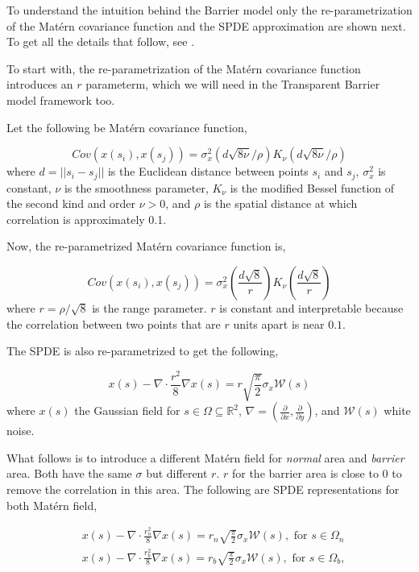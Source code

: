 \documentclass[
]{book}
\begin{document}
To understand the intuition behind the Barrier model only the re-parametrization of the Matérn covariance function and the SPDE approximation are shown next. To get all the details that follow, see \citet{bakka_non-stationary_2019}.

To start with, the re-parametrization of the Matérn covariance function introduces an \(r\) parameterm, which we will need in the Transparent Barrier model framework too.

Let the following be Matérn covariance function,

\[Cov\left(x(s_i), x(s_j)\right)=\sigma_x^2\left(d\sqrt{8 \nu} / \rho\right) K_\nu\left(d\sqrt{8 \nu} / \rho\right)\]
where \(d = ||s_i-s_j||\) is the Euclidean distance between points \(s_i\) and \(s_j\), \(\sigma_x^2\) is constant, \(\nu\) is the smoothness parameter, \(K_{\nu}\) is the modified Bessel function of the second kind and order \(\nu>0\), and \(\rho\) is the spatial distance at which correlation is approximately 0.1.

Now, the re-parametrized Matérn covariance function is,

\[Cov\left(x(s_i), x(s_j)\right)=\sigma_x^2 \left (\frac{d \sqrt{8}}{r}\right ) K_\nu \left (\frac{d \sqrt{8}}{r}\right )\]
where \(r=\rho/\sqrt{8}\) is the range parameter. \(r\) is constant and interpretable because the correlation between two points that are \(r\) units apart is near \(0.1\).

The SPDE is also re-parametrized to get the following,

\[x(s)-\nabla \cdot \frac{r^2}{8} \nabla x(s)=r \sqrt{\frac{\pi}{2}} \sigma_x \mathcal{W}(s)\]
where \(x(s)\) the Gaussian field for \(s \in \Omega \subseteq \mathbb{R}^2\), \(\nabla=\left(\frac{\partial}{\partial x}, \frac{\partial}{\partial y}\right)\), and \(\mathcal{W}(s)\) white noise.

What follows is to introduce a different Matérn field for \emph{normal} area and \emph{barrier} area. Both have the same \(\sigma\) but different \(r\). \(r\) for the barrier area is close to \(0\) to remove the correlation in this area. The following are SPDE representations for both Matérn field,

\[\begin{aligned}
& x(s)-\nabla \cdot \frac{r_n^2}{8} \nabla x(s)=r_n \sqrt{\frac{\pi}{2}} \sigma_x \mathcal{W}(s), \text { for } s \in \Omega_n \\
& x(s)-\nabla \cdot \frac{r_b^2}{8} \nabla x(s)=r_b \sqrt{\frac{\pi}{2}} \sigma_x \mathcal{W}(s), \text { for } s \in \Omega_b,
\end{aligned}\]
\end{document}
